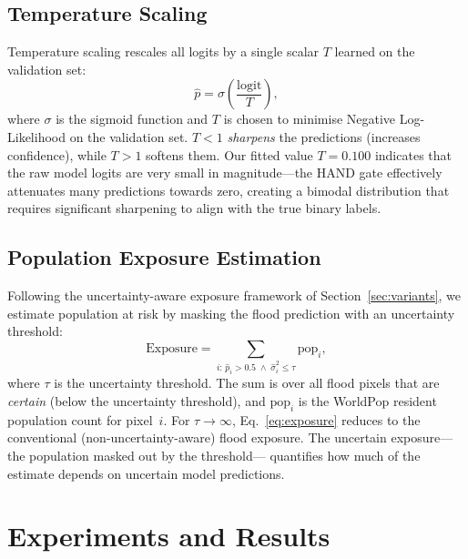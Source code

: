 \documentclass[12pt]{article}
\begin{document}
\subsection{Temperature Scaling}
\label{sec:temp}

Temperature scaling \cite{guo2017calibration} rescales all logits by a single
scalar $T$ learned on the validation set:
\begin{equation}
  \hat{p} = \sigma\!\left(\frac{\text{logit}}{T}\right),
  \label{eq:temp}
\end{equation}
where $\sigma$ is the sigmoid function and $T$ is chosen to minimise Negative
Log-Likelihood on the validation set.  $T < 1$ \emph{sharpens} the
predictions (increases confidence), while $T > 1$ softens them.  Our
fitted value $T = 0.100$ indicates that the raw model logits are very small
in magnitude—the HAND gate effectively attenuates many predictions towards
zero, creating a bimodal distribution that requires significant sharpening to
align with the true binary labels.

\subsection{Population Exposure Estimation}
\label{sec:exposure_method}

Following the uncertainty-aware exposure framework of Section~\ref{sec:variants},
we estimate population at risk by masking the flood prediction with an
uncertainty threshold:
\begin{equation}
  \text{Exposure} = \sum_{i:\,\hat{p}_i > 0.5 \;\wedge\; \hat{\sigma}^2_i \leq \tau}
                    \text{pop}_i,
  \label{eq:exposure}
\end{equation}
where $\tau$ is the uncertainty threshold.  The sum is over all flood pixels
that are \emph{certain} (below the uncertainty threshold), and $\text{pop}_i$
is the WorldPop resident population count for pixel~$i$.  For $\tau \to \infty$,
Eq.~\ref{eq:exposure} reduces to the conventional (non-uncertainty-aware) flood
exposure.  The uncertain exposure—the population masked out by the threshold—
quantifies how much of the estimate depends on uncertain model predictions.

\section{Experiments and Results}
\label{sec:experiments}
\end{document}
